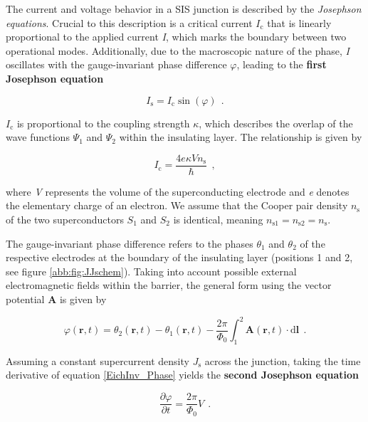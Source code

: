 The current and voltage behavior in a SIS junction is described by the \textit{Josephson equations}. Crucial to this description is a critical current \textit{$I_\mathrm{c}$} that is linearly proportional to the applied current \textit{I}, which marks the boundary between two operational modes. Additionally, due to the macroscopic nature of the phase, \textit{I} oscillates with the gauge-invariant phase difference $\varphi$, leading to the \textbf{first Josephson equation} \cite{Josephson1965}

\begin{equation}
\label{1.JE}
I_\mathrm{s} = I_\mathrm{c}\sin(\varphi) \ \ .
\end{equation}

$I_\mathrm{c}$ is proportional to the coupling strength $\kappa$, which describes the overlap of the wave functions $\Psi_1$ and $\Psi_2$ within the insulating layer. The relationship is given by

\begin{equation}
I_\mathrm{c} = \frac{4e\kappa V n_\mathrm{s}}{\hbar} \ \ ,
\end{equation}

where \textit{V} represents the volume of the superconducting electrode and \textit{e} denotes the elementary charge of an electron. We assume that the Cooper pair density $n_\mathrm{s}$ of the two superconductors $S_1$ and $S_2$ is identical, meaning $n_{\mathrm{s}1} = n_{\mathrm{s}2} = n_\mathrm{s}$.

The gauge-invariant phase difference refers to the phases $\theta_1$ and $\theta_2$ of the respective electrodes at the boundary of the insulating layer (positions 1 and 2, see figure \ref{abb:fig:JJschem}). Taking into account possible external electromagnetic fields within the barrier, the general form using the vector potential \textbf{A} is given by \cite{Gross2016}

\begin{equation}
\label{EichInv_Phase}
\varphi(\textbf{r},t) = \theta_2(\textbf{r},t) - \theta_1(\textbf{r},t) - \frac{2\pi}{\Phi_0}\int_{1}^{2}\textbf{A}(\textbf{r},t)\cdot \mathrm{d}\textbf{l} \ \ .
\end{equation}

Assuming a constant supercurrent density $J_\mathrm{s}$ across the junction, taking the time derivative of equation \eqref{EichInv_Phase} yields the \textbf{second Josephson equation} \cite{Josephson1965}

\begin{equation}
\label{2.JE}
\frac{\partial\varphi}{\partial t} = \frac{2\pi}{\Phi_0}V \ \ .
\end{equation}


